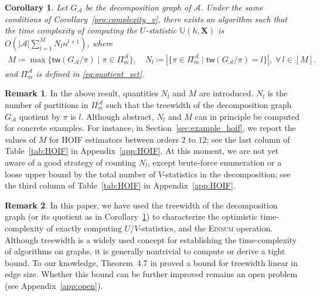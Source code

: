 \documentclass[sn-mathphys, natbib=false]{sn-jnl}
\theoremstyle{plain}
\newtheorem{corollary}{Corollary}
\theoremstyle{definition}
\newtheorem{remark}{Remark}
\def\Einsum{\textsc{Einsum}}
\newcommand{\ustat}{\mathbb{U}}
\newcommand{\ustatp}[2]{\ustat(#1,#2)}
\newcommand{\partition}{\Pi}
\newcommand{\partitionp}[1]{\partition_{#1}}
\newcommand{\treewidthp}[1]{\mathsf{tw}(#1)}
\newcommand{\less}{O}
\def\calA{\mathcal{A}}
\begin{document}
\begin{bibunit}[agsm]
\begin{corollary}
\label{cor:U}
Let $G_\calA$ be the decomposition graph of $\calA$.
Under the same conditions of Corollary~\ref{pro:complexity_v}, there exists an algorithm such that the time complexity of computing the $U$-statistic $\ustatp{h}{\bm{X}}$ is $\less(|\calA| \sum_{l = 1}^{M} N_{l} n^{l + 1})$, where 
\begin{align*}
M \coloneqq \max\{\treewidthp{G_\calA /\pi} \mid \pi \in \partitionp{m}^\calA \}, \quad N_{l} \coloneqq |\{\pi \in \Pi_{m}^{\calA} \mid \treewidthp{G_{\calA} / \pi} = l\}|, \; \forall \, l 
\in [M].
\end{align*}
and $\partitionp{m}^\calA$ is defined in \eqref{eq:quotient_set}.
\end{corollary}

\begin{remark}
\label{rem:U-complexity}
In the above result, quantities $N_{l}$ and $M$ are introduced. $N_{l}$ is the number of partitions in $\Pi_{m}^{\calA}$ such that the treewidth of the decomposition graph $G_{\calA}$ quotient by $\pi$ is $l$. Although abstract, $N_{l}$ and $M$ can in principle be computed for concrete examples. For instance, in Section~\ref{sec:example_hoif}, we report the values of $M$ for HOIF estimators between orders $2$ to $12$; see the last column of Table~\ref{tab:HOIF} in Appendix~\ref{app:HOIF}. At this moment, we are not yet aware of a good strategy of counting $N_{l}$, except brute-force enumeration or a loose upper bound by the total number of $V$-statistics in the decomposition; see the third column of Table~\ref{tab:HOIF} in Appendix~\ref{app:HOIF}.
\end{remark}



\begin{remark}
\label{rem:tw}
In this paper, we have used the treewidth of the decomposition graph (or its quotient as in Corollary~\ref{cor:U}) to characterize the optimistic time-complexity of exactly computing $U$/$V$-statistics, and the \Einsum{} operation. Although treewidth is a widely used concept for establishing the time-complexity of algorithms on graphs, it is generally nontrivial to compute or derive a tight bound. To our knowledge, Theorem~4.7 in \cite{kneis2009bound} proved a bound for treewidth linear in edge size. Whether this bound can be further improved remains an open problem (see Appendix~\ref{app:open}).
\end{remark}


\end{bibunit}
\end{document}
